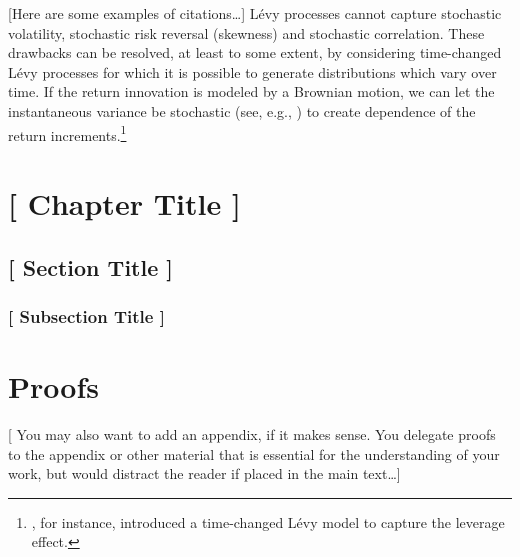 \documentclass[11pt,a4paper,english,oneside]{book}
\begin{document}
[Here are some examples of citations\dots] Lévy processes cannot capture stochastic volatility, stochastic risk reversal (skewness) and stochastic correlation. These drawbacks can be resolved, at least to some extent, by considering time-changed Lévy processes for which it is possible to generate distributions which vary over time. If the return innovation is modeled by a Brownian motion, we can let the instantaneous variance be stochastic (see, e.g., \textcite{SH1993,BA1996}) to create dependence of the return increments.\footnote{\textcite{CW2004}, for instance, introduced a time-changed Lévy model to capture the leverage effect.} 



\chapter{ [ Chapter Title ]}

\section{ [ Section Title ] }

\subsection{ [  Subsection Title ] }


\appendix
\begingroup
\makeatletter
\let\ps@plain\ps@empty
\appendixpage
\makeatother
\endgroup
\noappendicestocpagenum
\addappheadtotoc


\renewcommand{\theequation}{A.\arabic{equation}}

\chapter{Proofs\label{chp:proofs}}

[ You may also want to add an appendix, if it makes sense. You delegate proofs to the appendix or other material that is essential for the understanding of your work, but would distract the reader if placed in the main text\dots ]
\end{document}
